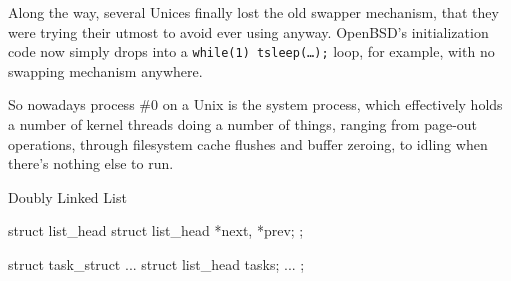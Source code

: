 \begin{description}
  Along the way, several Unices finally lost the old swapper mechanism, that they were
  trying their utmost to avoid ever using anyway. OpenBSD's initialization code now simply
  drops into a \texttt{while(1) tsleep(…);} loop, for example, with no swapping mechanism
  anywhere.

  So nowadays process \#0 on a Unix is the system process, which effectively holds a number
  of kernel threads doing a number of things, ranging from page-out operations, through
  filesystem cache flushes and buffer zeroing, to idling when there's nothing else to run.
\end{description}

\begin{frame}[fragile=singleslide]{Doubly Linked List}
  \begin{center}
  \end{center}
  \begin{varwidth}{.5\textwidth}
\begin{ccode}
struct list_head {
    struct list_head *next, *prev;
};
\end{ccode}
  \end{varwidth}\hfill
  \begin{varwidth}{.4\textwidth}
\begin{ccode}
struct task_struct {
    ...
    struct list_head tasks;
    ...
};
\end{ccode}
  \end{varwidth}
\end{frame}

